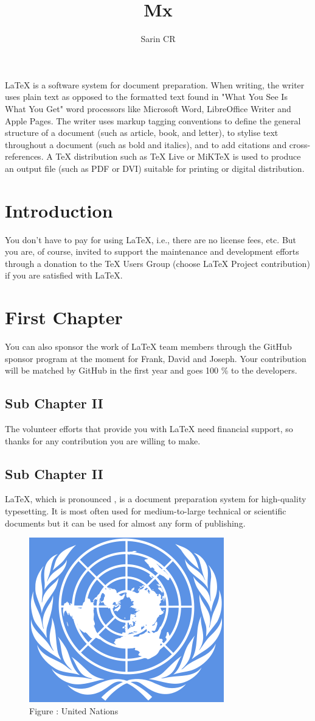 \documentclass[10pt,a4paper]{article}
\title{Mx}
\author{Sarin CR}
\begin{document}
\maketitle
LaTeX  is a software system for document preparation. When writing, the writer uses plain text as opposed to the formatted text found in "What You See Is What You Get" word processors like Microsoft Word, LibreOffice Writer and Apple Pages. The writer uses markup tagging conventions to define the general structure of a document (such as article, book, and letter), to stylise text throughout a document (such as bold and italics), and to add citations and cross-references. A TeX distribution such as TeX Live or MiKTeX is used to produce an output file (such as PDF or DVI) suitable for printing or digital distribution. 
\section{Introduction}
You don't have to pay for using LaTeX, i.e., there are no license fees, etc. But you are, of course, invited to support the maintenance and development efforts through a donation to the TeX Users Group (choose LaTeX Project contribution) if you are satisfied with LaTeX.
\section{First Chapter}
You can also sponsor the work of LaTeX team members through the GitHub sponsor program at the moment for Frank, David and Joseph. Your contribution will be matched by GitHub in the first year and goes 100 \% to the developers. 
\subsection{Sub Chapter II}
The volunteer efforts that provide you with LaTeX need financial support, so thanks for any contribution you are willing to make.
\subsection{Sub Chapter II}
LaTeX, which is pronounced  , is a document preparation system for high-quality typesetting. It is most often used for medium-to-large technical or scientific documents but it can be used for almost any form of publishing.
\begin{figure}[hbtp]
\caption{Figure : United Nations }
\centering
\includegraphics[scale=1]{800px-Flag_of_the_United_Nations.svg.png}
\end{figure}
\end{document}
